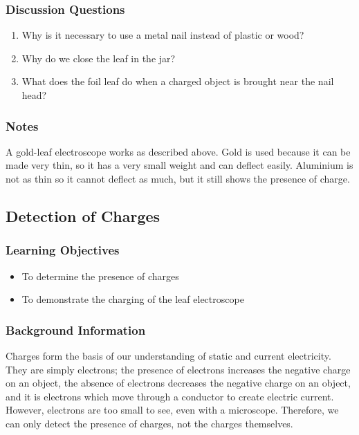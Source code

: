 \subsubsection*{Discussion Questions}
\begin{enumerate}
\item{Why is it necessary to use a metal nail instead of plastic or wood?}
\item{Why do we close the leaf in the jar?}
\item{What does the foil leaf do when a charged object is brought near the nail head?}
\end{enumerate}

\subsubsection*{Notes}
A gold-leaf electroscope works as described above. Gold is used because it can be made very thin, so it has a very small weight and can deflect easily. Aluminium is not as thin so it cannot deflect as much, but it still shows the presence of charge. 

\subsection{Detection of Charges}

\subsubsection*{Learning Objectives}
\begin{itemize}
\item{To determine the presence of charges} 
\item{To demonstrate the charging of the leaf electroscope} 
\end{itemize}

\subsubsection*{Background Information}
Charges form the basis of our understanding of static and current electricity. They are simply electrons; the presence of electrons increases the negative charge on an object, the absence of electrons decreases the negative charge on an object, and it is electrons which move through a conductor to create electric current. However, electrons are too small to see, even with a microscope. Therefore, we can only detect the presence of charges, not the charges themselves.

